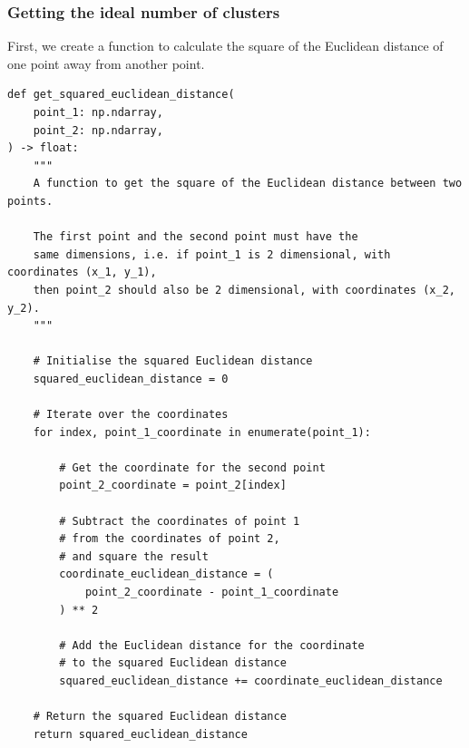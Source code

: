 \documentclass[11pt]{article}
\begin{document}
\subsubsection{Getting the ideal number of clusters}
\label{sec:org62092f5}
First, we create a function to calculate the square of the Euclidean distance of one point away from another point.
\begin{verbatim}
def get_squared_euclidean_distance(
    point_1: np.ndarray,
    point_2: np.ndarray,
) -> float:
    """
    A function to get the square of the Euclidean distance between two points.

    The first point and the second point must have the
    same dimensions, i.e. if point_1 is 2 dimensional, with coordinates (x_1, y_1),
    then point_2 should also be 2 dimensional, with coordinates (x_2, y_2).
    """

    # Initialise the squared Euclidean distance
    squared_euclidean_distance = 0

    # Iterate over the coordinates
    for index, point_1_coordinate in enumerate(point_1):

        # Get the coordinate for the second point
        point_2_coordinate = point_2[index]

        # Subtract the coordinates of point 1
        # from the coordinates of point 2,
        # and square the result
        coordinate_euclidean_distance = (
            point_2_coordinate - point_1_coordinate
        ) ** 2

        # Add the Euclidean distance for the coordinate
        # to the squared Euclidean distance
        squared_euclidean_distance += coordinate_euclidean_distance

    # Return the squared Euclidean distance
    return squared_euclidean_distance
\end{verbatim}

 \newpage
\end{document}
